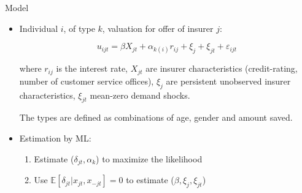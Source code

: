 \documentclass[notes, 10pt,aspectratio=169]{beamer}
\begin{document}
\begin{frame}{Model}

\begin{itemize}
    \item Individual $i$, of type $k$,  valuation for offer of insurer $j$: 

    $$ u_{ijt} = \beta X_{jt}+ \alpha_{k(i)} r_{ij} + \xi_j +\xi_{jt} + \varepsilon_{ijt}  $$

    where $r_{ij}$ is the interest rate, $X_{jt}$  are insurer characteristics (credit-rating, number of customer service offices), $\xi_j$ are persistent unobserved insurer characteristics, $\xi_{jt}$ mean-zero demand shocks.  

    The types are defined as combinations of age, gender and amount saved.

    \item Estimation by ML: 
    \begin{enumerate}
        \item Estimate  ($\delta_{jt}, \alpha_k$) to maximize the likelihood 
        \item Use $\mathbb{E}[\delta_{jt}|x_{jt},x_{-jt}]= 0$ to estimate ($\beta, \xi_j, \xi_{jt}$)
    \end{enumerate}
\end{itemize}
\end{frame}
\end{document}
